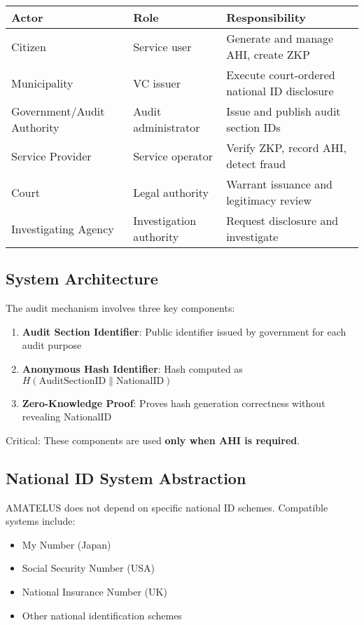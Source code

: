 \begin{table}[h]
\centering
\begin{tabular}{|l|l|l|}
\hline
\textbf{Actor} & \textbf{Role} & \textbf{Responsibility} \\
\hline
Citizen & Service user & Generate and manage AHI, create ZKP \\
Municipality & VC issuer & Execute court-ordered national ID disclosure \\
Government/Audit Authority & Audit administrator & Issue and publish audit section IDs \\
Service Provider & Service operator & Verify ZKP, record AHI, detect fraud \\
Court & Legal authority & Warrant issuance and legitimacy review \\
Investigating Agency & Investigation authority & Request disclosure and investigate \\
\hline
\end{tabular}
\end{table}

\subsection{System Architecture}

The audit mechanism involves three key components:

\begin{enumerate}
  \item \textbf{Audit Section Identifier}: Public identifier issued by government for each audit purpose
  \item \textbf{Anonymous Hash Identifier}: Hash computed as $H(\text{AuditSectionID} \parallel \text{NationalID})$
  \item \textbf{Zero-Knowledge Proof}: Proves hash generation correctness without revealing NationalID
\end{enumerate}

Critical: These components are used \textbf{only when AHI is required}.

\subsection{National ID System Abstraction}

AMATELUS does not depend on specific national ID schemes. Compatible systems include:

\begin{itemize}
  \item My Number (Japan)
  \item Social Security Number (USA)
  \item National Insurance Number (UK)
  \item Other national identification schemes
\end{itemize}

